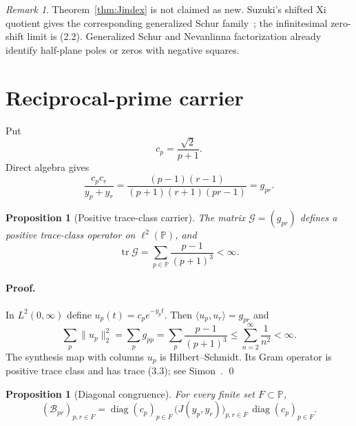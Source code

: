 \documentclass[11pt]{article}
\newtheorem{proposition}[theorem]{Proposition}
\theoremstyle{definition}
\theoremstyle{remark}
\newtheorem{remark}[theorem]{Remark}
\newcommand{\PP}{\mathbb P}
\newcommand{\cB}{\mathcal B}
\newcommand{\cG}{\mathcal G}
\newcommand{\diag}{\operatorname{diag}}
\newcommand{\tr}{\operatorname{tr}}
\newcommand{\ip}[2]{\langle #1,#2\rangle}
\newcommand{\norm}[1]{\lVert #1\rVert}
\begin{document}
\begin{remark}
Theorem~\ref{thm:Jindex} is not claimed as new.  Suzuki's shifted Xi quotient gives the
corresponding generalized Schur family~\cite{Suzuki2012}; the infinitesimal zero-shift limit is
(2.2).  Generalized Schur and Nevanlinna factorization already identify half-plane poles or zeros
with negative squares.
\end{remark}

\section{Reciprocal-prime carrier}
\label{sec:carrier}

Put
\begin{equation}
 c_p=\frac{\sqrt2}{p+1}.                                   \tag{3.1}
\end{equation}
Direct algebra gives
\begin{equation}
 \frac{c_pc_r}{y_p+y_r}
 =\frac{(p-1)(r-1)}
 {(p+1)(r+1)(pr-1)}
 =g_{pr}.                                                   \tag{3.2}
\end{equation}

\begin{proposition}[Positive trace-class carrier]
\label{prop:G}
The matrix $\cG=(g_{pr})$ defines a positive trace-class operator on $\ell^2(\PP)$, and
\begin{equation}
 \tr\cG=\sum_{p\in\PP}\frac{p-1}{(p+1)^3}<\infty.           \tag{3.3}
\end{equation}
\end{proposition}

\paragraph{Proof.}
In $L^2(0,\infty)$ define $u_p(t)=c_pe^{-y_pt}$.  Then
$\ip{u_p}{u_r}=g_{pr}$ and
\[
 \sum_p\norm{u_p}_2^2
 =\sum_p g_{pp}
 =\sum_p\frac{p-1}{(p+1)^3}
 \leq\sum_{n=2}^{\infty}\frac1{n^2}<\infty.
\]
The synthesis map with columns $u_p$ is Hilbert--Schmidt.  Its Gram operator is positive trace
class and has trace (3.3); see Simon~\cite{Simon2005}. \qed

\begin{proposition}[Diagonal congruence]
\label{prop:congruence}
For every finite set $F\subset\PP$,
\begin{equation}
 (\cB_{pr})_{p,r\in F}
 =\diag(c_p)_{p\in F}\,
   \bigl(J(y_p,y_r)\bigr)_{p,r\in F}\,
   \diag(c_p)_{p\in F}.                                    \tag{3.4}
\end{equation}
\end{proposition}
\end{document}
